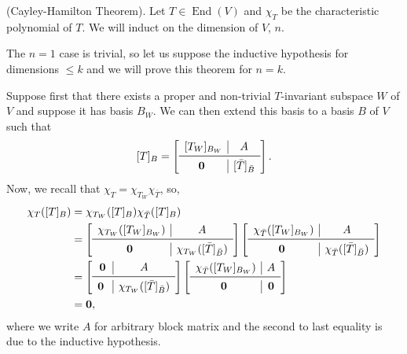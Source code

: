 \documentclass[
]{article}
\theoremstyle{definition}
\begin{document}
\proof (Cayley-Hamilton Theorem). Let \(T \in \mathop{\mathrm{End}}(V)\)
and \(\chi_T\) be the characteristic polynomial of \(T\). We will induct
on the dimension of \(V\), \(n\).

The \(n = 1\) case is trivial, so let us suppose the inductive
hypothesis for dimensions \(\le k\) and we will prove this theorem for
\(n = k\).

Suppose first that there exists a proper and non-trivial \(T\)-invariant
subspace \(W\) of \(V\) and suppose it has basis \(B_W\). We can then
extend this basis to a basis \(B\) of \(V\) such that \[[T]_B = 
    \left[
      \begin{array}{c|c}
        [T_W]_{B_W} & A \\
        \midrule
        \mathbf{0} & [\bar{T}]_{\bar{B}}
      \end{array}
      \right]. \] Now, we recall that
\(\chi_T = \chi_{T_W} \chi_{\bar{T}}\), so, \begin{align*}
    \chi_T([T]_B) & = \chi_{T_W}([T]_B) \chi_{\bar{T}}([T]_B)\\
    & = 
    \left[
      \begin{array}{c|c}
        \chi_{T_W}([T_W]_{B_W}) & A \\
        \midrule
        \mathbf{0} & \chi_{T_W}([\bar{T}]_{\bar{B}})
      \end{array}
    \right]
    \left[
      \begin{array}{c|c}
        \chi_{\bar{T}}([T_W]_{B_W}) & A \\
        \midrule
        \mathbf{0} & \chi_{\bar{T}}([\bar{T}]_{\bar{B}})
      \end{array}
    \right]\\
    & = 
    \left[
      \begin{array}{c|c}
        \mathbf{0} & A \\
        \midrule
        \mathbf{0} & \chi_{T_W}([\bar{T}]_{\bar{B}})
      \end{array}
    \right]
    \left[
      \begin{array}{c|c}
        \chi_{\bar{T}}([T_W]_{B_W}) & A \\
        \midrule
        \mathbf{0} & \mathbf{0}
      \end{array}
    \right]\\
    & = \mathbf{0},
  \end{align*} where we write \(A\) for arbitrary block matrix and the
second to last equality is due to the inductive hypothesis.
\end{document}
